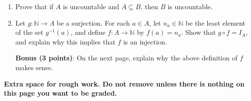 \documentclass[12pt]{article}
\newcommand{\points}[1]{\marginpar{\hspace{24pt}[#1]}}
\begin{document}
\begin{enumerate}
\vspace{2.5in}

\item Prove that if $A$ is uncountable and $A\subseteq B$, then $B$ is uncountable. \points{3}
 
\vspace{2in}

\item Let $g:\mathbb{N}\to A$ be a surjection. For each $a\in A$, let $n_a\in\mathbb{N}$ be the least element of the set $g^{-1}(a)$, and define $f:A\to \mathbb{N}$ by $f(a) = n_a$. Show that $g\circ f = I_A$, and explain why this implies that $f$ is an injection.\points{4}

\vspace{3in}

{\bf Bonus (3 points)}: On the next page, explain why the above definition of $f$ makes sense.
\end{enumerate}
\newpage

{\bf Extra space for rough work. Do not remove unless there is nothing on this page you want to be graded.}
\end{document}
